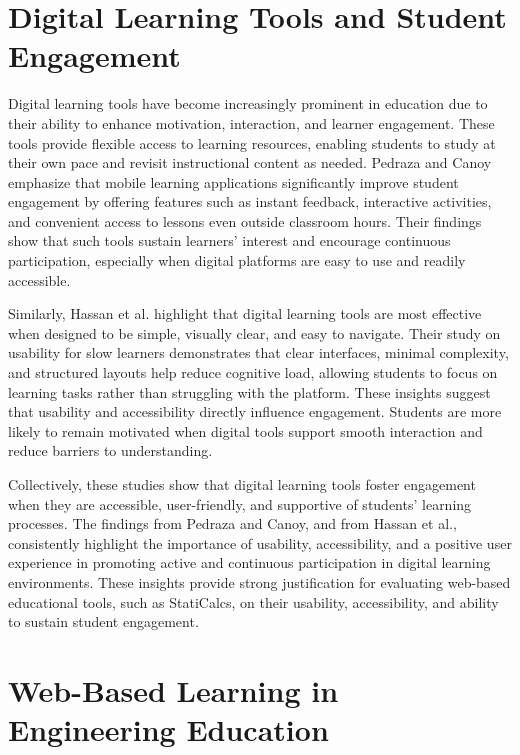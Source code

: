\section{Digital Learning Tools and Student Engagement}

Digital learning tools have become increasingly prominent in education due to their ability to enhance motivation, interaction, and learner engagement. These tools provide flexible access to learning resources, enabling students to study at their own pace and revisit instructional content as needed. Pedraza and Canoy emphasize that mobile learning applications significantly improve student engagement by offering features such as instant feedback, interactive activities, and convenient access to lessons even outside classroom hours. Their findings show that such tools sustain learners’ interest and encourage continuous participation, especially when digital platforms are easy to use and readily accessible.

Similarly, Hassan et al. highlight that digital learning tools are most effective when designed to be simple, visually clear, and easy to navigate. Their study on usability for slow learners demonstrates that clear interfaces, minimal complexity, and structured layouts help reduce cognitive load, allowing students to focus on learning tasks rather than struggling with the platform. These insights suggest that usability and accessibility directly influence engagement. Students are more likely to remain motivated when digital tools support smooth interaction and reduce barriers to understanding.

Collectively, these studies show that digital learning tools foster engagement when they are accessible, user-friendly, and supportive of students’ learning processes. The findings from Pedraza and Canoy, and from Hassan et al., consistently highlight the importance of usability, accessibility, and a positive user experience in promoting active and continuous participation in digital learning environments. These insights provide strong justification for evaluating web-based educational tools, such as StatiCalcs, on their usability, accessibility, and ability to sustain student engagement.

\section{Web-Based Learning in Engineering Education}

